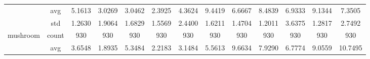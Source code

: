 \begin{table}[htbp]
{\begin{tabular}{rcccccccccccc}
                                                     & avg                                    & 5.1613                                                                             & 3.0269                                                                    & 3.0462                                                                    & \cellcolor[rgb]{ .776,  .937,  .808}\textcolor[rgb]{ 0,  .38,  0}{2.3925} & 4.3624                                        & 9.4419                                      & 6.6667                                         & 8.4839                                         & 6.9333                                         & 9.1344                                         & 7.3505                                         \\
                                                     & std                                    & 1.2630                                                                             & 1.9064                                                                    & 1.6829                                                                    & 1.5569                                                                    & 2.4400                                        & 1.6211                                      & 1.4704                                         & 1.2011                                         & 3.6375                                         & 1.2817                                         & 2.7492                                         \\
                  mushroom                           & count                                  & 930                                                                                & 930                                                                       & 930                                                                       & 930                                                                       & 930                                           & 930                                         & 930                                            & 930                                            & 930                                            & 930                                            & 930                                            \\
                                                     & avg                                    & 3.6548                                                                             & \cellcolor[rgb]{ .776,  .937,  .808}\textcolor[rgb]{ 0,  .38,  0}{1.8935} & 5.3484                                                                    & 2.2183                                                                    & 3.1484                                        & 5.5613                                      & 9.6634                                         & 7.9290                                         & 6.7774                                         & 9.0559                                         & 10.7495                                        \\

\end{tabular}}
\end{table}

